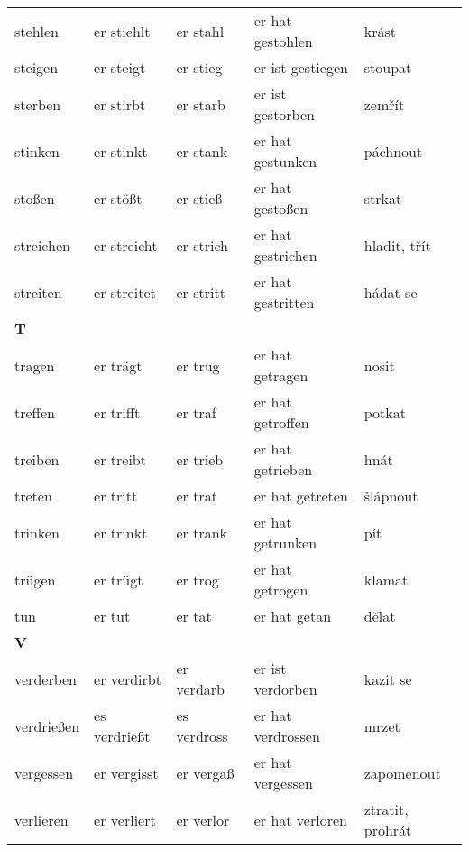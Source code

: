 \documentclass[a4paper,12pt]{report}
\begin{document}
\begin{longtable}{ | m{2cm} | m{2.5cm} | m{2.5cm} | m{4cm} | m{3cm} | }
    stehlen     & er stiehlt    & er stahl     & er hat gestohlen   & krást              \\
    steigen     & er steigt     & er stieg     & er ist gestiegen   & stoupat            \\
    sterben     & er stirbt     & er starb     & er ist gestorben   & zemřít             \\
    stinken     & er stinkt     & er stank     & er hat gestunken   & páchnout           \\
    stoßen      & er stößt      & er stieß     & er hat gestoßen    & strkat             \\
    streichen   & er streicht   & er strich    & er hat gestrichen  & hladit, třít       \\
    streiten    & er streitet   & er stritt    & er hat gestritten  & hádat se           \\
    \hline
    \textbf{T}  &               &              &                    &                    \\
    tragen      & er trägt      & er trug      & er hat getragen    & nosit              \\
    treffen     & er trifft     & er traf      & er hat getroffen   & potkat             \\
    treiben     & er treibt     & er trieb     & er hat getrieben   & hnát               \\
    treten      & er tritt      & er trat      & er hat getreten    & šlápnout           \\
    trinken     & er trinkt     & er trank     & er hat getrunken   & pít                \\
    trügen      & er trügt      & er trog      & er hat getrogen    & klamat             \\
    tun         & er tut        & er tat       & er hat getan       & dělat              \\
    \hline
    \textbf{V}  &               &              &                    &                    \\
    verderben   & er verdirbt   & er verdarb   & er ist verdorben   & kazit se           \\
    verdrießen  & es verdrießt  & es verdross  & er hat verdrossen  & mrzet              \\
    vergessen   & er vergisst   & er vergaß    & er hat vergessen   & zapomenout         \\
    verlieren   & er verliert   & er verlor    & er hat verloren    & ztratit, prohrát   \\

\end{longtable}
\end{document}

